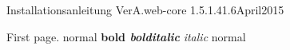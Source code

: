 \documentclass{tarentanleitung}
\begin{document}
\tarentanleitung
 {Installationsanleitung VerA.web-core}
 {1.5.1.4}{1.6}{April}{2015}

First page. normal \textbf{bold \textit{bolditalic}} \textit{italic} normal
\end{document}

